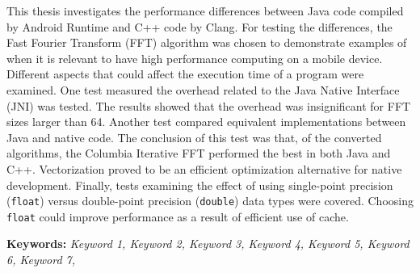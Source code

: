 This thesis investigates the performance differences between Java code compiled by Android Runtime and C++ code by Clang. For testing the differences, the Fast Fourier Transform (FFT) algorithm was chosen to demonstrate examples of when it is relevant to have high performance computing on a mobile device. Different aspects that could affect the execution time of a program were examined. One test measured the overhead related to the Java Native Interface (JNI) was tested. The results showed that the overhead was insignificant for FFT sizes larger than 64. Another test compared equivalent implementations between Java and native code. The conclusion of this test was that, of the converted algorithms, the Columbia Iterative FFT performed the best in both Java and C++. Vectorization proved to be an efficient optimization alternative for native development. Finally, tests examining the effect of using single-point precision (\texttt{float}) versus double-point precision (\texttt{double}) data types were covered. Choosing \texttt{float} could improve performance as a result of efficient use of cache.

\textbf{Keywords:} \emph{Keyword 1, Keyword 2, Keyword 3, Keyword 4, Keyword 5, Keyword 6, Keyword 7, }

